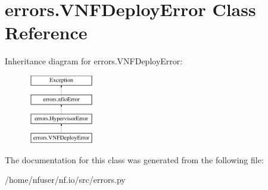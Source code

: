 \hypertarget{classerrors_1_1VNFDeployError}{\section{errors.\-V\-N\-F\-Deploy\-Error Class Reference}
\label{classerrors_1_1VNFDeployError}
}
Inheritance diagram for errors.\-V\-N\-F\-Deploy\-Error\-:\begin{figure}[H]
\begin{center}
\leavevmode
\includegraphics[height=3.000000cm]{classerrors_1_1VNFDeployError}
\end{center}
\end{figure}


The documentation for this class was generated from the following file\-:\begin{DoxyCompactItemize}
\item 
/home/nfuser/nf.\-io/src/errors.\-py\end{DoxyCompactItemize}
